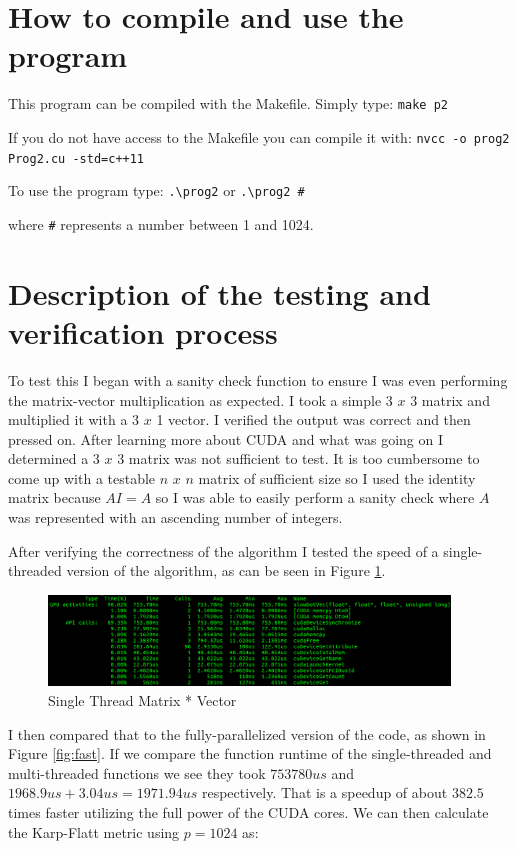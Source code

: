 \documentclass{article}
\begin{document}
\section{How to compile and use the program}
This program can be compiled with the Makefile. Simply type: \texttt{make p2}

\noindent If you do not have access to the Makefile you can compile it with:
\verb|nvcc -o prog2 Prog2.cu -std=c++11|

\noindent To use the program type: \verb|.\prog2| or \verb|.\prog2 #| 

\noindent where \verb|#| represents a number between 1 and 1024.

\newpage
\section{Description of the testing and verification process}{\label{sec:test}}
To test this I began with a sanity check function to ensure I was even 
performing the matrix-vector multiplication as expected. I took a simple 3 $x$ 3 
matrix and multiplied it with a 3 $x$ 1 vector. I verified the output was correct 
and then pressed on. After learning more about CUDA and what was going on I 
determined a 3 $x$ 3 matrix was not sufficient to test. It is too cumbersome to 
come up with a testable $n$ $x$ $n$ matrix of sufficient size so I used the identity 
matrix because $AI = A$ so I was able to easily perform a sanity check where $A$ 
was represented with an ascending number of integers. 

After verifying the correctness of the algorithm I tested the speed of a 
single-threaded version of the algorithm, as can be seen in Figure \ref{fig:slow}.

\begin{figure}[h]
    \centering
    \includegraphics[width=0.95\textwidth]{slow}
    \caption{Single Thread Matrix * Vector}
    \label{fig:slow}
\end{figure}

I then compared that to the fully-parallelized version of the code, as shown in 
Figure \ref{fig:fast}. If we compare the function runtime of the single-threaded 
and multi-threaded functions we see they took $753780us$ and 
$1968.9us + 3.04us = 1971.94us$ respectively. That is a speedup of about $382.5$ 
times faster utilizing the full power of the CUDA cores. We can then calculate 
the Karp-Flatt metric using $p=1024$ as:
\end{document}
